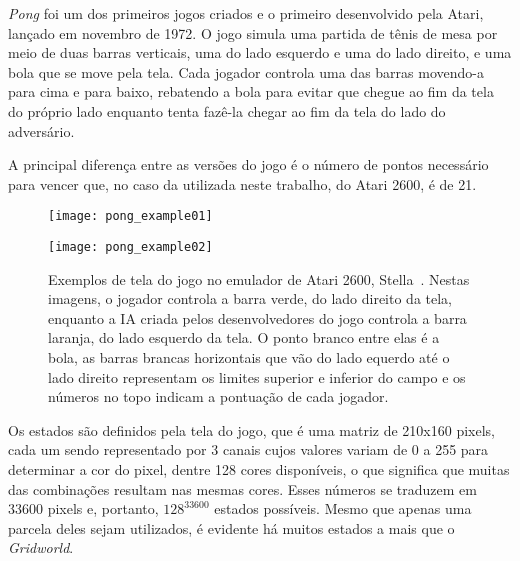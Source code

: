 \textit{Pong} foi um dos primeiros jogos criados e o primeiro desenvolvido pela Atari, lançado em novembro de 1972.
O jogo simula uma partida de tênis de mesa por meio de duas barras verticais, uma do lado esquerdo e uma do lado direito, e uma bola que se move pela tela.
Cada jogador controla uma das barras movendo-a para cima e para baixo, rebatendo a bola para evitar que chegue ao fim da tela do próprio lado enquanto tenta fazê-la chegar ao fim da tela do lado do adversário.

A principal diferença entre as versões do jogo é o número de pontos necessário para vencer que, no caso da utilizada neste trabalho, do Atari 2600, é de 21.

\begin{figure}[h!]
  \begin{minipage}[b]{.5\textwidth}
  \centering
  \texttt{[image: pong\_example01]}
  \end{minipage}
  \hfill
  \begin{minipage}[b]{.5\textwidth}
  \texttt{[image: pong\_example02]}
  \end{minipage}
  \caption{Exemplos de tela do jogo no emulador de Atari 2600, Stella~\cite{stella}. Nestas imagens, o jogador controla a barra verde, do lado direito da tela, enquanto a IA criada pelos desenvolvedores do jogo controla a barra laranja, do lado esquerdo da tela. O ponto branco entre elas é a bola, as barras brancas horizontais que vão do lado equerdo até o lado direito representam os limites superior e inferior do campo e os números no topo indicam a pontuação de cada jogador.}
\end{figure}

Os estados são definidos pela tela do jogo, que é uma matriz de 210x160 pixels, cada um sendo representado por 3 canais cujos valores variam de 0 a 255 para determinar a cor do pixel, dentre 128 cores disponíveis, o que significa que muitas das combinações resultam nas mesmas cores.
Esses números se traduzem em 33600 pixels e, portanto, $128^{33600}$ estados possíveis.
Mesmo que apenas uma parcela deles sejam utilizados, é evidente há muitos estados a mais que o \textit{Gridworld}.

